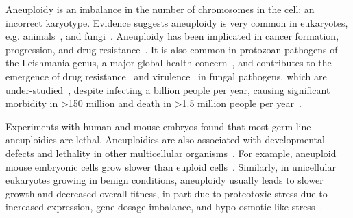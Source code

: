 \documentclass[12pt]{extarticle}
\begin{document}
Aneuploidy is an imbalance in the number of chromosomes in the cell: an incorrect karyotype.
Evidence suggests aneuploidy is very common in eukaryotes, e.g. animals~\citep{Santaguida2015review, Naylor2016, Bakhoum2017}, and fungi~\citep{Pavelka2010, Zhu2016, Robbins2017, Todd2017}.
Aneuploidy has been implicated in cancer formation, progression, and drug resistance~\citep{Boveri2008, Schvartzman2010, Santaguida2015review, Rutledge2016, Ippolito2021b, Lukow2021}.
It is also common in protozoan pathogens of the Leishmania genus, a major global health concern~\citep{Mannaert2012}, and contributes to the emergence of drug resistance~\citep{Selmecki2009} and virulence~\citep{Moller2018} in fungal pathogens, which are under-studied~\citep{Rodrigues2018}, despite infecting a billion people per year, causing significant morbidity in >150 million and death in >1.5 million people per year~\citep{Selmecki2009, Rodrigues2018}.

Experiments with human and mouse embryos found that most germ-line aneuploidies are lethal.
Aneuploidies are also associated with developmental defects and lethality in other multicellular organisms~\citep{Sheltzer2011}. %
For example, aneuploid mouse embryonic cells grow slower than euploid cells~\citep{Williams2008}.
Similarly, in unicellular eukaryotes growing in benign conditions, aneuploidy usually leads to slower growth and decreased overall fitness, in part due to proteotoxic stress due to increased expression, gene dosage imbalance, and hypo-osmotic-like stress~\citep{Niwa2006, Torres2007, Pavelka2010, Sheltzer2011, Santaguida2015, Kasuga2016, Zhu2018, Tsai2019, Yang2021}.
\end{document}
